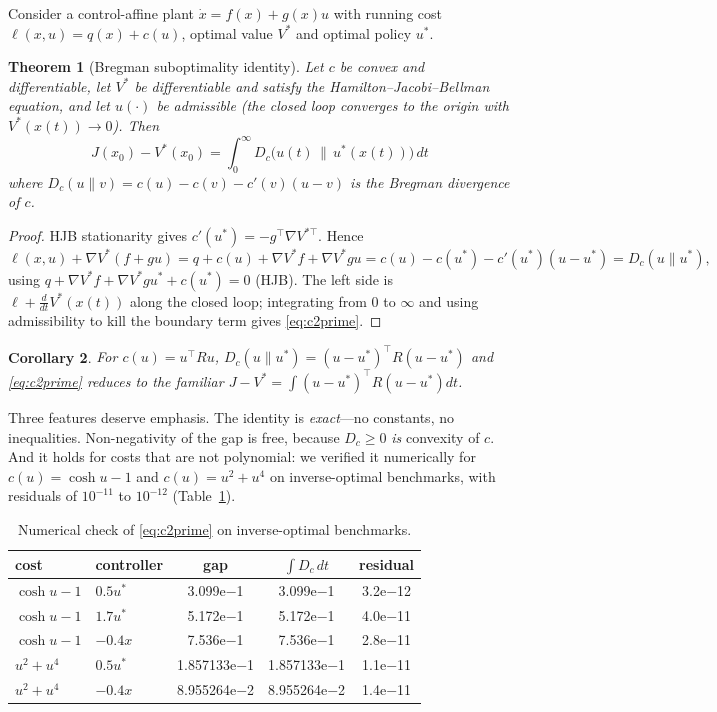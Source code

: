 \documentclass[11pt]{article}
\theoremstyle{plain}
\newtheorem{theorem}{Theorem}
\newtheorem{corollary}[theorem]{Corollary}
\theoremstyle{definition}
\begin{document}
Consider a control-affine plant $\dot x=f(x)+g(x)u$ with running cost
$\ell(x,u)=q(x)+c(u)$, optimal value $V^{*}$ and optimal policy $u^{*}$.

\begin{theorem}[Bregman suboptimality identity]
\label{thm:c2prime}
Let $c$ be convex and differentiable, let $V^{*}$ be differentiable and satisfy
the Hamilton--Jacobi--Bellman equation, and let $u(\cdot)$ be admissible (the
closed loop converges to the origin with $V^{*}(x(t))\to0$). Then
\begin{equation}
\boxed{\ J(x_0)-V^{*}(x_0)=\int_0^{\infty}
D_c\big(u(t)\,\|\,u^{*}(x(t))\big)\,dt\ }
\label{eq:c2prime}
\end{equation}
where $D_c(u\|v)=c(u)-c(v)-c'(v)(u-v)$ is the Bregman divergence of $c$.
\end{theorem}

\begin{proof}
HJB stationarity gives $c'(u^{*})=-g^{\top}\nabla V^{*\top}$. Hence
\[
\ell(x,u)+\nabla V^{*}(f+gu)
=q+c(u)+\nabla V^{*}f+\nabla V^{*}gu
=c(u)-c(u^{*})-c'(u^{*})(u-u^{*})=D_c(u\|u^{*}),
\]
using $q+\nabla V^{*}f+\nabla V^{*}gu^{*}+c(u^{*})=0$ (HJB). The left side is
$\ell+\frac{d}{dt}V^{*}(x(t))$ along the closed loop; integrating from $0$ to
$\infty$ and using admissibility to kill the boundary term gives
\eqref{eq:c2prime}.
\end{proof}

\begin{corollary}
For $c(u)=u^{\top}Ru$, $D_c(u\|u^{*})=(u-u^{*})^{\top}R(u-u^{*})$ and
\eqref{eq:c2prime} reduces to the familiar
$J-V^{*}=\int(u-u^{*})^{\top}R(u-u^{*})dt$.
\end{corollary}

Three features deserve emphasis. The identity is \emph{exact}---no constants, no
inequalities. Non-negativity of the gap is free, because $D_c\ge0$ \emph{is}
convexity of $c$. And it holds for costs that are not polynomial: we verified
it numerically for $c(u)=\cosh u-1$ and $c(u)=u^2+u^4$ on inverse-optimal
benchmarks, with residuals of $10^{-11}$ to $10^{-12}$
(Table~\ref{tab:bregman}).

\begin{table}[t]
\centering
\caption{Numerical check of \eqref{eq:c2prime} on inverse-optimal benchmarks.}
\label{tab:bregman}
\begin{tabular}{llccc}
\toprule
cost & controller & gap & $\int D_c\,dt$ & residual \\
\midrule
$\cosh u-1$ & $0.5u^{*}$ & 3.099e$-$1 & 3.099e$-$1 & 3.2e$-$12 \\
$\cosh u-1$ & $1.7u^{*}$ & 5.172e$-$1 & 5.172e$-$1 & 4.0e$-$11 \\
$\cosh u-1$ & $-0.4x$    & 7.536e$-$1 & 7.536e$-$1 & 2.8e$-$11 \\
$u^2+u^4$   & $0.5u^{*}$ & 1.857133e$-$1 & 1.857133e$-$1 & 1.1e$-$11 \\
$u^2+u^4$   & $-0.4x$    & 8.955264e$-$2 & 8.955264e$-$2 & 1.4e$-$11 \\
\bottomrule
\end{tabular}
\end{table}
\end{document}
